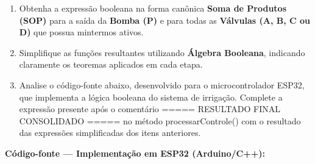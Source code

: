 \documentclass[12pt]{article}
\begin{document}
\begin{enumerate}[label=\textbf{\alph*)}, leftmargin=2cm]
  \item Obtenha a expressão booleana na forma canônica \textbf{Soma de Produtos (SOP)}
        para a saída da \textbf{Bomba (P)} e para todas as \textbf{Válvulas (A, B, C ou D)} 
        que possua mintermos ativos.
  \item Simplifique as funções resultantes utilizando \textbf{Álgebra Booleana},
        indicando claramente os teoremas aplicados em cada etapa.
  \item Analise o código-fonte abaixo, desenvolvido para o microcontrolador ESP32,
        que implementa a lógica booleana do sistema de irrigação. Complete a expressão
         presente após o comentário ===== RESULTADO FINAL CONSOLIDADO ===== no método processarControle() com o resultado
         das expressões simplificadas dos itens anteriores.
\end{enumerate}

\bigskip
\noindent\textbf{Código-fonte — Implementação em ESP32 (Arduino/C++):}
\end{document}
